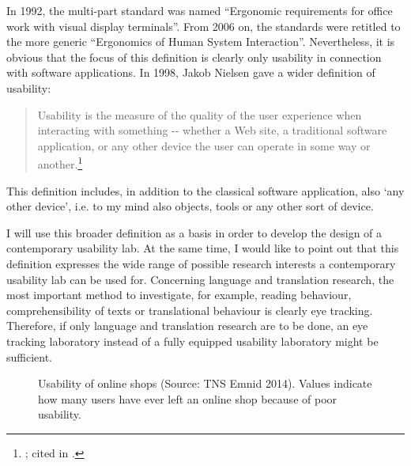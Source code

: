 \documentclass[output=paper]{langsci/langscibook}
\begin{document}
In 1992, the multi-part standard was named ``Ergonomic requirements for office work with visual display terminals''. From 2006 on, the standards were retitled to the more generic ``Ergonomics of Human System Interaction''. Nevertheless, it is obvious that the focus of this definition is clearly only usability in connection with software applications. In 1998, Jakob Nielsen gave a wider definition of usability:

\begin{quote}
Usability is the measure of the quality of the user experience when interacting with something -{}- whether a Web site, a traditional software application, or any other device the user can operate in some way or another.\footnote{ \citet{Nielsen1998}; cited in \citet{Eichinger1999}.}
\end{quote}

This definition includes, in addition to the classical software application, also `any other device', i.e. to my mind also objects, tools or any other sort of device. 

I will use this broader definition as a basis in order to develop the design of a contemporary usability lab. At the same time, I would like to point out that this definition expresses the wide range of possible research interests a contemporary usability lab can be used for. Concerning language and translation research, the most important method to investigate, for example, reading behaviour, comprehensibility of texts or translational behaviour is clearly eye tracking. Therefore, if only language and translation research are to be done, an eye tracking laboratory instead of a fully equipped usability laboratory might be sufficient.

  
\begin{figure}[t]



 \caption{Usability of online shops (Source: TNS Emnid 2014). Values indicate how many users have ever left an online shop because of poor usability.}
 \label{roesener:fig:1}
\end{figure} 
 
\end{document}
